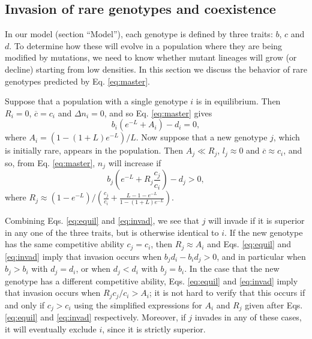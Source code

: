 \documentclass[11pt]{article}
\begin{document}

\subsection*{Invasion of rare genotypes and coexistence}\label{sec:invas}

In our model (section ``Model''), each genotype is defined by three traits: $b$, $c$ and $d$. To determine how these will evolve in a population where they are being modified by mutations, we need to know whether mutant lineages will grow (or decline) starting from low densities. In this section we discuss the behavior of rare genotypes predicted by Eq. \eqref{eq:master}. 

Suppose that a population with a single genotype $i$ is in equilibrium. Then $R_i=0$, $\overline{c}=c_i$ and $\Delta n_i = 0$, and so Eq. \eqref{eq:master} gives
\begin{equation}
b_i\left(e^{-L}+A_i\right)-d_i=0,\label{eq:equil}
\end{equation}
where $A_i=(1-(1+L)e^{-L})/L$. Now suppose that a new genotype $j$, which is initially rare, appears in the population. Then $A_j\ll R_j$, $l_j\approx 0$ and $\overline{c}\approx c_i$, and so, from Eq. \eqref{eq:master}, $n_j$ will increase if 
\begin{equation}
b_j \left(e^{-L}+R_j\frac{c_j}{c_i}\right)-d_j>0,\label{eq:invad}
\end{equation}
where $R_j\approx (1-e^{-L})/\left(\frac{c_j}{c_i}+\frac{L-1-e^{-L}}{1-(1+L)e^{-L}}\right)$. 

Combining Eqs. \eqref{eq:equil} and \eqref{eq:invad}, we see that $j$ will invade if it is superior in any one of the three traits, but is otherwise identical to $i$. If the new genotype has the same competitive ability $c_j=c_i$, then $R_j\approx A_i$ and Eqs. \eqref{eq:equil} and \eqref{eq:invad} imply that invasion occurs when $b_jd_i-b_id_j>0$, and in particular when $b_j>b_i$ with $d_j=d_i$, or when $d_j<d_i$ with $b_j=b_i$. In the case that the new genotype has a different competitive ability, Eqs. \eqref{eq:equil} and \eqref{eq:invad} imply that invasion occurs when $R_j c_j/c_i > A_i$; it is not hard to verify that this occurs if and only if $c_j>c_i$ using the simplified expressions for $A_i$ and $R_j$ given after Eqs. \eqref{eq:equil} and \eqref{eq:invad} respectively. Moreover, if $j$ invades in any of these cases, it will eventually exclude $i$, since it is strictly superior. 
\end{document}

